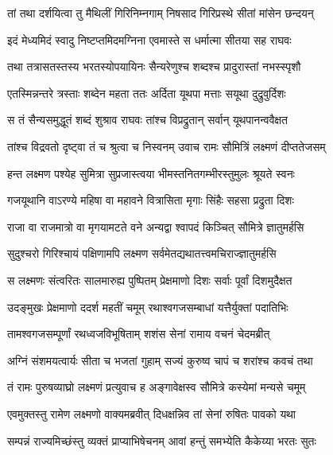 
\twolineshloka
{तां तथा दर्शयित्वा तु मैथिलीं गिरिनिम्नगाम्}
{निषसाद गिरिप्रस्थे सीतां मांसेन छन्दयन्} %

\twolineshloka
{इदं मेध्यमिदं स्वादु निष्टप्तमिदमग्निना}
{एवमास्ते स धर्मात्मा सीतया सह राघवः} %

\twolineshloka
{तथा तत्रासतस्तस्य भरतस्योपयायिनः}
{सैन्यरेणुश्च शब्दश्च प्रादुरास्तां नभस्स्पृशौ} %

\twolineshloka
{एतस्मिन्नन्तरे त्रस्ताः शब्देन महता ततः}
{अर्दिता यूथपा मत्ताः सयूथा दुद्रुवुर्दिशः} %

\twolineshloka
{स तं सैन्यसमुद्धूतं शब्दं शुश्राव राघवः}
{तांश्च विप्रद्रुतान् सर्वान् यूथपानन्ववैक्षत} %

\twolineshloka
{तांश्च विद्रवतो दृष्ट्वा तं च श्रुत्वा च निस्वनम्}
{उवाच रामः सौमित्रिं लक्ष्मणं दीप्ततेजसम्} %

\twolineshloka
{हन्त लक्ष्मण पश्येह सुमित्रा सुप्रजास्त्वया}
{भीमस्तनितगम्भीरस्तुमुलः श्रूयते स्वनः} %

\twolineshloka
{गजयूथानि वाऽरण्ये महिषा वा महावने}
{वित्रासिता मृगाः सिंहैः सहसा प्रद्रुता दिशः} %

\twolineshloka
{राजा वा राजमात्रो वा मृगयामटते वने}
{अन्यद्वा श्वापदं किञ्चित् सौमित्रे ज्ञातुमर्हसि} %

\twolineshloka
{सुदुश्चरो गिरिश्चायं पक्षिणामपि लक्ष्मण}
{सर्वमेतद्यथातत्त्वमचिराज्ज्ञातुमर्हसि} %

\twolineshloka
{स लक्ष्मणः संत्वरितः सालमारुह्य पुष्पितम्}
{प्रेक्षमाणो दिशः सर्वाः पूर्वां दिशमुदैक्षत} %

\twolineshloka
{उदङ्मुखः प्रेक्षमाणो ददर्श महतीं चमूम्}
{रथाश्वगजसम्बाधां यत्तैर्युक्तां पदातिभिः} %

\twolineshloka
{तामश्वगजसम्पूर्णां रथध्वजविभूषिताम्}
{शशंस सेनां रामाय वचनं चेदमब्रीत्} %

\twolineshloka
{अग्निं संशमयत्वार्यः सीता च भजतां गुहाम्}
{सज्यं कुरुष्व चापं च शरांश्च कवचं तथा} %

\twolineshloka
{तं रामः पुरुषव्याघ्रो लक्ष्मणं प्रत्युवाच ह}
{अङ्गावेक्षस्व सौमित्रे कस्येमां मन्यसे चमूम्} %

\twolineshloka
{एवमुक्तस्तु रामेण लक्ष्मणो वाक्यमब्रवीत्}
{दिधक्षन्निव तां सेनां रुषितः पावको यथा} %

\twolineshloka
{सम्पन्नं राज्यमिच्छंस्तु व्यक्तं प्राप्याभिषेचनम्}
{आवां हन्तुं समभ्येति कैकेय्या भरतः सुतः} %

